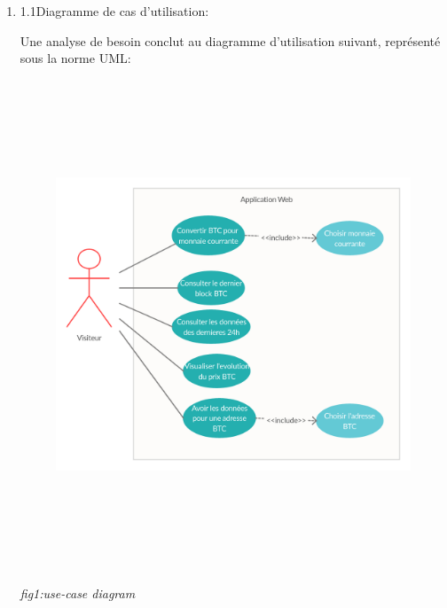 \documentclass[12pt]{article}
\begin{document}
\begin{enumerate}
\begin{enumerate}
	\item 1.1\tab Diagramme de cas d’utilisation:\par

Une analyse de besoin conclut au diagramme d’utilisation suivant, représenté sous la norme UML:\par




\begin{figure}[H]
\advance\leftskip -0.12in		\includegraphics[width=6.94in,height=5.75in]{./media/image2.png}
\end{figure}



\par

\textit{fig1:\tab use-case diagram}\par


\vspace{\baselineskip}

\vspace{\baselineskip}

\vspace{\baselineskip}

\vspace{\baselineskip}


\end{enumerate}
\end{enumerate}
\end{document}
